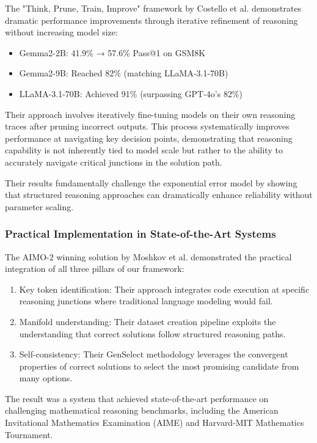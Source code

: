 \documentclass{article}
\begin{document}
The "Think, Prune, Train, Improve" framework by Costello et al. \citep{costello2025think} demonstrates dramatic performance improvements through iterative refinement of reasoning without increasing model size:

\begin{itemize}
\item Gemma2-2B: 41.9\% → 57.6\% Pass@1 on GSM8K
\item Gemma2-9B: Reached 82\% (matching LLaMA-3.1-70B)
\item LLaMA-3.1-70B: Achieved 91\% (surpassing GPT-4o's 82\%)
\end{itemize}

Their approach involves iteratively fine-tuning models on their own reasoning traces after pruning incorrect outputs. This process systematically improves performance at navigating key decision points, demonstrating that reasoning capability is not inherently tied to model scale but rather to the ability to accurately navigate critical junctions in the solution path.

Their results fundamentally challenge the exponential error model by showing that structured reasoning approaches can dramatically enhance reliability without parameter scaling.

\subsubsection{Practical Implementation in State-of-the-Art Systems}

The AIMO-2 winning solution by Moshkov et al. \citep{moshkov2025aimo} demonstrated the practical integration of all three pillars of our framework:

\begin{enumerate}
\item Key token identification: Their approach integrates code execution at specific reasoning junctions where traditional language modeling would fail.
\item Manifold understanding: Their dataset creation pipeline exploits the understanding that correct solutions follow structured reasoning paths.
\item Self-consistency: Their GenSelect methodology leverages the convergent properties of correct solutions to select the most promising candidate from many options.
\end{enumerate}

The result was a system that achieved state-of-the-art performance on challenging mathematical reasoning benchmarks, including the American Invitational Mathematics Examination (AIME) and Harvard-MIT Mathematics Tournament.
\end{document}
